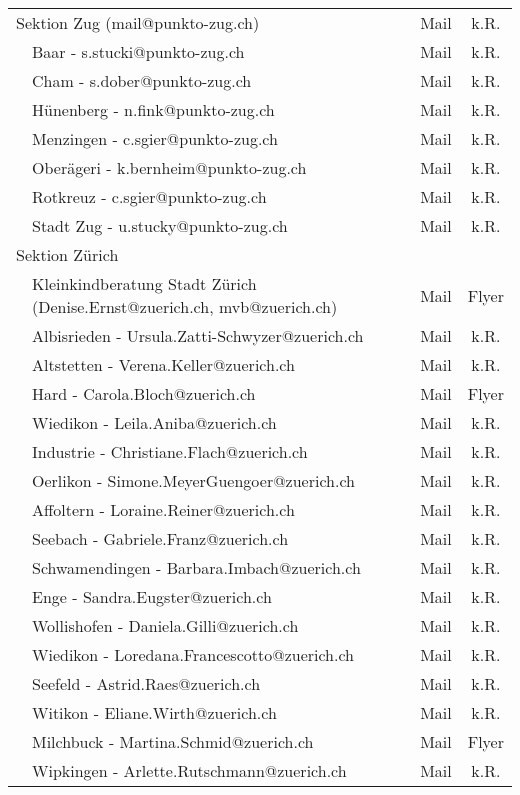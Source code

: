 \begin{longtable}[htbp]{|p{0.2em} p{20em} | c | c |}
  \multicolumn{2}{|l|}{Sektion Zug (mail@punkto-zug.ch)} & Mail & k.R.\\
  & Baar - s.stucki@punkto-zug.ch & Mail & k.R.\\
  & Cham - s.dober@punkto-zug.ch & Mail & k.R.\\
  & Hünenberg - n.fink@punkto-zug.ch & Mail & k.R.\\
  & Menzingen - c.sgier@punkto-zug.ch & Mail & k.R.\\
  & Oberägeri - k.bernheim@punkto-zug.ch & Mail & k.R.\\
  & Rotkreuz - c.sgier@punkto-zug.ch & Mail & k.R.\\
  & Stadt Zug - u.stucky@punkto-zug.ch & Mail & k.R.\\
  \multicolumn{2}{|l|}{Sektion Zürich} &  & \\
  & Kleinkindberatung Stadt Zürich (Denise.Ernst@zuerich.ch, mvb@zuerich.ch) & Mail & Flyer\\
  & Albisrieden - Ursula.Zatti-Schwyzer@zuerich.ch & Mail & k.R.\\
  & Altstetten - Verena.Keller@zuerich.ch & Mail & k.R.\\
  & Hard - Carola.Bloch@zuerich.ch & Mail & Flyer\\
  & Wiedikon - Leila.Aniba@zuerich.ch & Mail & k.R.\\
  & Industrie - Christiane.Flach@zuerich.ch & Mail & k.R.\\
  & Oerlikon - Simone.MeyerGuengoer@zuerich.ch & Mail & k.R.\\
  & Affoltern - Loraine.Reiner@zuerich.ch & Mail & k.R.\\
  & Seebach - Gabriele.Franz@zuerich.ch & Mail & k.R.\\
  & Schwamendingen  - Barbara.Imbach@zuerich.ch & Mail & k.R.\\
  & Enge - Sandra.Eugster@zuerich.ch & Mail & k.R.\\
  & Wollishofen - Daniela.Gilli@zuerich.ch & Mail & k.R.\\
  & Wiedikon - Loredana.Francescotto@zuerich.ch & Mail & k.R.\\
  & Seefeld - Astrid.Raes@zuerich.ch & Mail & k.R.\\
  & Witikon -  Eliane.Wirth@zuerich.ch & Mail & k.R.\\
  & Milchbuck - Martina.Schmid@zuerich.ch & Mail & Flyer\\
  & Wipkingen - Arlette.Rutschmann@zuerich.ch & Mail & k.R.\\
\end{longtable}


